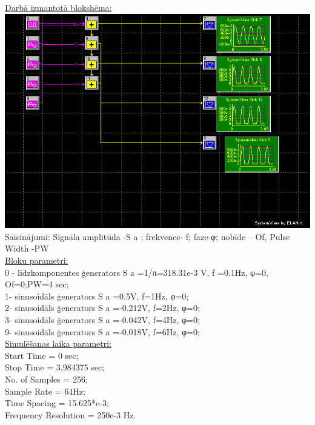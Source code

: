 \documentclass[a4paper,  margin=1in]{report}
\begin{document}
\normalsize
\underline{
    Darbā izmantotā blokshēma:
}\\
\includegraphics[width=\textwidth,height=\textheight,keepaspectratio]{v2_1.png}
Saīsinājumi: Signāla amplitūda -S a ; frekvence- f; faze-φ; nobīde – Of, Pulse Width -PW\\
\underline{Bloku parametri:}\\
0 - līdzkomponentes ģenerators S a =1/π=318.31e-3 V, f =0.1Hz, φ=0, Of=0;PW=4 sec;\\
1- sinusoidāls ģenerators S a =0.5V, f=1Hz, φ=0;\\
2- sinusoidāls ģenerators S a =-0.212V, f=2Hz, φ=0;\\
3- sinusoidāls ģenerators S a =-0.042V, f=4Hz, φ=0;\\
9- sinusoidāls ģenerators S a =-0.018V, f=6Hz, φ=0;\\
\underline{Simulēšanas laika parametri:}\\
Start Time = 0 sec;\\
Stop Time = 3.984375 sec;\\
No. of Samples = 256;\\
Sample Rate = 64Hz;\\
Time Spacing = 15.625*e-3;\\
Frequency Resolution = 250e-3 Hz.\\
\end{document}
